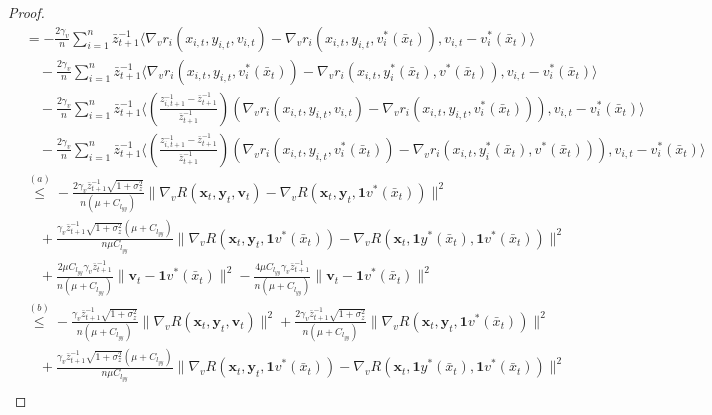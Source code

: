 \documentclass{article}
\theoremstyle{plain}
\theoremstyle{definition}
\theoremstyle{remark}
\begin{document}
\begin{proof}
\begin{align}
&= - \frac{2\gamma_v}{n}\sum_{i=1}^n \bar{z}^{-1}_{t+1} \langle \nabla_v r_i(x_{i,t}, y_{i,t}, v_{i,t})- \nabla_v r_i(x_{i,t}, y_{i,t}, v_i^*(\bar{x}_{t})) , v_{i,t} - v_i^*(\bar{x}_t)\rangle \nonumber \\
&\quad - \frac{2\gamma_v}{n}\sum_{i=1}^n \bar{z}^{-1}_{t+1} \langle \nabla_v r_i(x_{i,t}, y_{i,t}, v_i^*(\bar{x}_{t}))- \nabla_v r_i(x_{i,t},y_i^*(\bar{x}_{t}), v^*(\bar{x}_{t})) , v_{i,t} - v_i^*(\bar{x}_t) \rangle \nonumber \\
&\quad - \frac{2\gamma_v}{n}\sum_{i=1}^n \bar{z}^{-1}_{t+1} \Bigg\langle\!\!\! \left(\!\!\frac{z_{i,t+1}^{-1}\!\!-\!\!\bar{z}_{t+1}^{-1}}{\bar{z}_{t+1}^{-1}}\!\!\right)\!\!(\nabla_v r_i(x_{i,t}, y_{i,t}, v_{i,t})\!\!-\!\! \nabla_v r_i(x_{i,t}, y_{i,t}, v_i^*(\bar{x}_{t}))) , v_{i,t} \!\!-\!\! v_i^*(\bar{x}_t)\!\!\!\Bigg\rangle \nonumber \\
&\quad - \frac{2\gamma_v}{n}\sum_{i=1}^n \bar{z}^{-1}_{t+1} \Bigg\langle\!\!\! \left(\!\!\frac{z_{i,t+1}^{-1}\!\!-\!\!\bar{z}_{t+1}^{-1}}{\bar{z}_{t+1}^{-1}}\!\!\right)\!\!(\nabla_v r_i(x_{i,t}, y_{i,t}, v_i^*(\bar{x}_{t}))\!\!-\!\!\nabla_v r_i(x_{i,t},y_i^*(\bar{x}_{t}), v^*(\bar{x}_{t}))) , v_{i,t} \!\!-\!\! v_i^*(\bar{x}_t) \!\!\!\Bigg\rangle \nonumber \\
&\overset{(a)}{\leq} -\frac{2\gamma_v\bar{z}_{t+1}^{-1}\sqrt{1+\sigma_z^2}}{n(\mu + C_{l_{yy}})} \|\nabla_v R(\mathbf{x}_t, \mathbf{y}_t, \mathbf{v}_t) - \nabla_v R(\mathbf{x}_t, \mathbf{y}_t, \mathbf{1}v^*(\bar{x}_t))\|^2 \nonumber \\
&\quad + \frac{\gamma_v\bar{z}_{t+1}^{-1}\sqrt{1+\sigma_z^2}(\mu + C_{l_{yy}})}{n\mu C_{l_{yy}}} \|\nabla_v R(\mathbf{x}_t, \mathbf{y}_t, \mathbf{1}v^*(\bar{x}_t)) - \nabla_v R(\mathbf{x}_t, \mathbf{1}y^*(\bar{x}_t), \mathbf{1}v^*(\bar{x}_t))\|^2\nonumber\\
&\quad+ \frac{2\mu C_{l_{yy}}\gamma_v\bar{z}_{t+1}^{-1}}{n(\mu + C_{l_{yy}})} \|\mathbf{v}_t - \mathbf{1}v^*(\bar{x}_t)\|^2  - \frac{4\mu C_{l_{yy}}\gamma_v\bar{z}_{t+1}^{-1}}{n(\mu + C_{l_{yy}})} \|\mathbf{v}_t - \mathbf{1}v^*(\bar{x}_t)\|^2\nonumber\\
&\overset{(b)}{\leq} -\frac{\gamma_v\bar{z}_{t+1}^{-1}\sqrt{1+\sigma_z^2}}{n(\mu + C_{l_{yy}})} \|\nabla_v R(\mathbf{x}_t, \mathbf{y}_t, \mathbf{v}_t)\|^2 
+ \frac{2\gamma_v\bar{z}_{t+1}^{-1}\sqrt{1+\sigma_z^2}}{n(\mu + C_{l_{yy}})}\| \nabla_v R(\mathbf{x}_t, \mathbf{y}_t, \mathbf{1}v^*(\bar{x}_t))\|^2 \nonumber \\
&\quad + \frac{\gamma_v\bar{z}_{t+1}^{-1}\sqrt{1+\sigma_z^2}(\mu + C_{l_{yy}})}{n\mu C_{l_{yy}}} \|\nabla_v R(\mathbf{x}_t, \mathbf{y}_t, \mathbf{1}v^*(\bar{x}_t)) - \nabla_v R(\mathbf{x}_t, \mathbf{1}y^*(\bar{x}_t), \mathbf{1}v^*(\bar{x}_t))\|^2 \nonumber \\

\end{align}
\end{proof}
\end{document}
